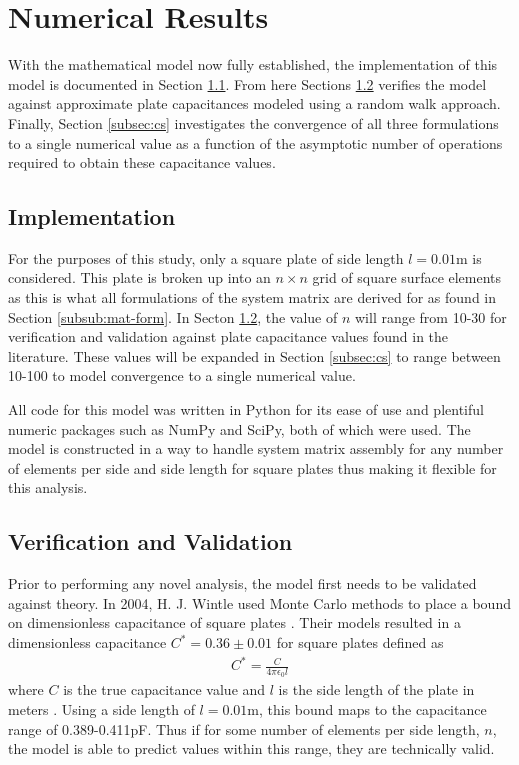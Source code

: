 \section{Numerical Results}
\label{sec:numres}
With the mathematical model now fully established, the implementation of this model is documented in Section \ref{subsec:impl}. From here Sections \ref{subsec:vv} verifies the model against approximate plate capacitances modeled using a random walk approach. Finally, Section \ref{subsec:cs} investigates the convergence of all three formulations to a single numerical value as a function of the asymptotic number of operations required to obtain these capacitance values.

\subsection{Implementation}
\label{subsec:impl} 
For the purposes of this study, only a square plate of side length $l=0.01$m is considered. This plate is broken up into an $n\times n$ grid of square surface elements as this is what all formulations of the system matrix are derived for as found in Section \ref{subsub:mat-form}. In Secton \ref{subsec:vv}, the value of $n$ will range from 10-30 for verification and validation against plate capacitance values found in the literature. These values will be expanded in Section \ref{subsec:cs} to range between 10-100 to model convergence to a single numerical value.

All code for this model was written in Python for its ease of use and plentiful numeric packages such as NumPy and SciPy, both of which were used. The model is constructed in a way to handle system matrix assembly for any number of elements per side and side length for square plates thus making it flexible for this analysis.

\subsection{Verification and Validation}
\label{subsec:vv}
Prior to performing any novel analysis, the model first needs to be validated against theory. In 2004, H. J. Wintle used Monte Carlo methods to place a bound on dimensionless capacitance of square plates \cite{randomwalk}. Their models resulted in a dimensionless capacitance $C^*=0.36\pm0.01$ for square plates defined as
\begin{align}
	C^*=\frac{C}{4\pi\epsilon_0l}
\end{align}
where $C$ is the true capacitance value and $l$ is the side length of the plate in meters \cite{randomwalk}. Using a side length of $l=0.01$m, this bound maps to the capacitance range of 0.389-0.411pF. Thus if for some number of elements per side length, $n$, the model is able to predict values within this range, they are technically valid.

